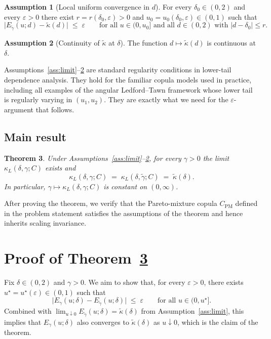 \documentclass[11pt]{article}
\newtheorem{theorem}{Theorem}
\theoremstyle{definition}
\newtheorem{assumption}[theorem]{Assumption}
\newcommand{\PM}{\mathrm{PM}}
\newcommand{\eps}{\varepsilon}
\begin{document}
\begin{assumption}[Local uniform convergence in $d$]\label{ass:uniform}
For every $\delta_0\in(0,2)$ and every $\eps>0$ there exist
$r=r(\delta_0,\eps)>0$ and $u_0=u_0(\delta_0,\eps)\in(0,1)$ such that
\[
\bigl|E_{\tilde\gamma}(u;d)-\tilde\kappa(d)\bigr|\;\le\;\eps
\qquad
\text{for all }u\in(0,u_0]\text{ and all }d\in(0,2)\text{ with }
|d-\delta_0|\le r.
\]
\end{assumption}

\begin{assumption}[Continuity of $\tilde\kappa$ at $\delta$]\label{ass:cont}
The function $d\mapsto\tilde\kappa(d)$ is continuous at $\delta$.
\end{assumption}

Assumptions~\ref{ass:limit}--\ref{ass:cont} are standard regularity
conditions in lower-tail dependence analysis. They hold for the
familiar copula models used in practice, including all examples of
the angular Ledford--Tawn framework whose lower tail is regularly
varying in $(u_1,u_2)$. They are exactly what we need for the
$\eps$-argument that follows.

\subsection{Main result}

\begin{theorem}\label{thm:main}
Under Assumptions~\textnormal{\ref{ass:limit}--\ref{ass:cont}}, for
every $\gamma>0$ the limit $\kappa_L(\delta,\gamma;C)$ exists and
\[
\kappa_L(\delta,\gamma;C)
\;=\;
\kappa_L(\delta,\tilde\gamma;C)
\;=\;
\tilde\kappa(\delta).
\]
In particular, $\gamma\mapsto\kappa_L(\delta,\gamma;C)$ is constant on
$(0,\infty)$.
\end{theorem}

After proving the theorem, we verify that the Pareto-mixture copula
$C_{\PM}$ defined in the problem statement satisfies the assumptions
of the theorem and hence inherits scaling invariance.

\section{Proof of Theorem~\ref{thm:main}}

Fix $\delta\in(0,2)$ and $\gamma>0$. We aim to show that, for every
$\eps>0$, there exists $u^\star=u^\star(\eps)\in(0,1)$ such that
\begin{equation}\label{eq:goal}
\bigl|E_\gamma(u;\delta)-E_{\tilde\gamma}(u;\delta)\bigr|
\;\le\;\eps
\qquad \text{for all }u\in(0,u^\star].
\end{equation}
Combined with $\lim_{u\downarrow 0}E_{\tilde\gamma}(u;\delta)=\tilde\kappa(\delta)$ from
Assumption~\ref{ass:limit}, this implies that $E_\gamma(u;\delta)$ also
converges to $\tilde\kappa(\delta)$ as $u\downarrow 0$, which is the
claim of the theorem.
\end{document}
